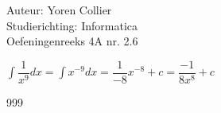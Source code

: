 \documentclass[a4paper]{article}
\newcommand{\intgrl}{\displaystyle\int} %
\begin{document}
\noindent \large Auteur: Yoren Collier \\
\noindent \large Studierichting: Informatica\\
\noindent \large Oefeningenreeks 4A nr. 2.6\\

\medskip

\normalsize

$ \intgrl \dfrac{1}{x^9} dx = \intgrl x^{-9} dx = \dfrac{1}{-8} x^{-8} +c = \dfrac{-1}{8x^8} +c$\\

\begin{thebibliography}{999}
\end{thebibliography}
\end{document}
